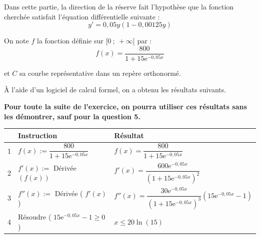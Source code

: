 \documentclass[10pt]{article}
\providecommand{\e}{{\mathrm{e}}}
\begin{document}
	Dans cette partie, la direction de la réserve fait l'hypothèse que la fonction cherchée satisfait l'équation différentielle suivante :
	$$
	y'=0,05 y(1-0,00125 y)
	$$

	On note $f$ la fonction définie sur $[0 ~;~ +\infty[$ par :
	$$
	f(x)=\dfrac{800}{1+15 \e^{-0,05 x}}
	$$

	et $C$ sa courbe représentative dans un repère orthonormé.

	\medskip

	À l'aide d'un logiciel de calcul formel, on a obtenu les résultats suivants.

	\textbf{Pour toute la suite de l'exercice, on pourra utiliser ces résultats sans les démontrer, sauf pour la question 5.}

	\begin{center}
	\renewcommand{\arraystretch}{2.5}
\begin{tabularx}{\linewidth}{|l|l|>{\centering \arraybackslash}X|} 
\hline
  & Instruction & Résultat \\	
\hline
1 & $f(x):=\dfrac{800}{1+15 \e^{-0,05 x}}$	& $f(x)=\dfrac{800}{1+15 \e^{-0,05 x}}$  \\	
\hline
2 & $f'(x):=$ Dérivée $(f(x))$ & $f'(x)=\dfrac{600 \e^{-0,05 x}}{\left(1+15 \e^{-0,05 x}\right)^{2}}$ \\ 
\hline
3 & $f''(x):=$ Dérivée ( $f'(x)$ ) & $f''(x)=\dfrac{30 \e^{-0,05 x}}{\left(1+15 \e^{-0,05 x}\right)^{3}}\left(15 \e^{-0,05 x}-1\right)$ \\ 
\hline
4 & Résoudre ( $15 \e^{-0,05 x}-1 \geqslant 0$ )  & $x \leqslant 20 \ln (15)$  \\		
\hline
\end{tabularx}
\renewcommand{\arraystretch}{1}













	\end{center}
\end{document}
